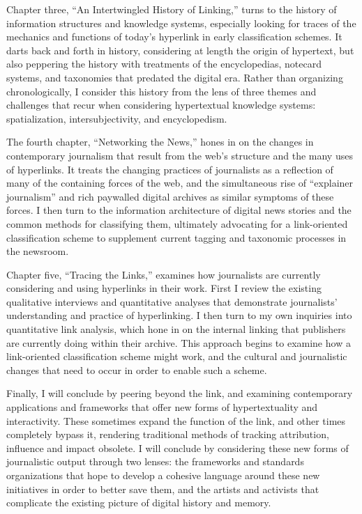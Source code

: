 Chapter three, ``An Intertwingled History of Linking,'' turns to the history of information structures and knowledge systems, especially looking for traces of the mechanics and functions of today's hyperlink in early classification schemes. It darts back and forth in history, considering at length the origin of hypertext, but also peppering the history with treatments of the encyclopedias, notecard systems, and taxonomies that predated the digital era. Rather than organizing chronologically, I consider this history from the lens of three themes and challenges that recur when considering hypertextual knowledge systems: spatialization, intersubjectivity, and encyclopedism.

The fourth chapter, ``Networking the News,'' hones in on the changes in contemporary journalism that result from the web's structure and the many uses of hyperlinks. It treats the changing practices of journalists as a reflection of many of the containing forces of the web, and the simultaneous rise of ``explainer journalism'' and rich paywalled digital archives as similar symptoms of these forces. I then turn to the information architecture of digital news stories and the common methods for classifying them, ultimately advocating for a link-oriented classification scheme to supplement current tagging and taxonomic processes in the newsroom.

Chapter five, ``Tracing the Links,'' examines how journalists are currently considering and using hyperlinks in their work. First I review the existing qualitative interviews and quantitative analyses that demonstrate journalists' understanding and practice of hyperlinking. I then turn to my own inquiries into quantitative link analysis, which hone in on the internal linking that publishers are currently doing within their archive. This approach begins to examine how a link-oriented classification scheme might work, and the cultural and journalistic changes that need to occur in order to enable such a scheme.

Finally, I will conclude by peering beyond the link, and examining contemporary applications and frameworks that offer new forms of hypertextuality and interactivity. These sometimes expand the function of the link, and other times completely bypass it, rendering traditional methods of tracking attribution, influence and impact obsolete. I will conclude by considering these new forms of journalistic output through two lenses: the frameworks and standards organizations that hope to develop a cohesive language around these new initiatives in order to better save them, and the artists and activists that complicate the existing picture of digital history and memory.

